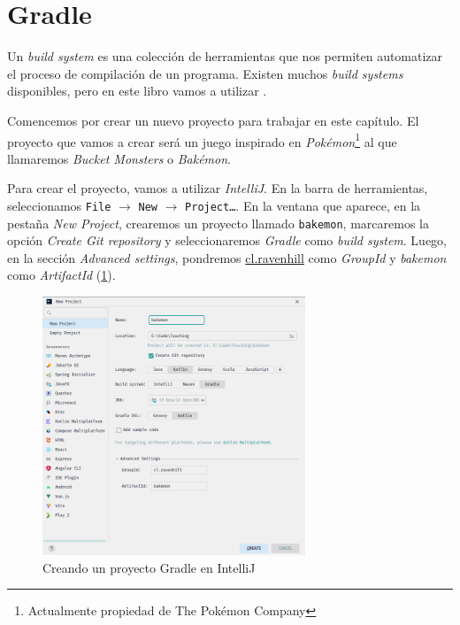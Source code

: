 
\section{Gradle}
  \label{subsec:gradle}

  Un \textit{build system} es una colección de herramientas que nos permiten
  automatizar el proceso de compilación de un programa.
  Existen muchos \textit{build systems} disponibles, pero en este libro vamos a utilizar
  .

  Comencemos por crear un nuevo proyecto para trabajar en este capítulo.
  El proyecto que vamos a crear será un juego inspirado en \textit{Pokémon}\footnote{
    Actualmente propiedad de The Pokémon Company
  } al que llamaremos \textit{Bucket Monsters} o \textit{Bakémon}.

  Para crear el proyecto, vamos a utilizar \textit{IntelliJ}.
  En la barra de herramientas, seleccionamos \texttt{File} $\rightarrow$ \texttt{New} $\rightarrow$
  \texttt{Project\dots}.
  En la ventana que aparece, en la pestaña \textit{New Project}, crearemos un proyecto llamado
  \texttt{bakemon}, marcaremos la opción \textit{Create Git repository} y seleccionaremos 
  \textit{Gradle} como \textit{build system}.
  Luego, en la sección \textit{Advanced settings}, pondremos \url{cl.ravenhill} como 
  \textit{GroupId} y \textit{bakemon} como \textit{ArtifactId} (\cref{fig:gradle-project}).

  \begin{figure}[ht!]
    \centering
    \includegraphics[width=0.7\textwidth]{img/oop/tdd/gradle/gradle-project.png}
    \caption{Creando un proyecto Gradle en IntelliJ}
    \label{fig:gradle-project}
  \end{figure}

